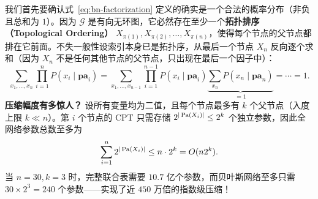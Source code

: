 我们首先要确认式~\eqref{eq:bn-factorization} 定义的确实是一个合法的概率分布（非负且总和为 $1$）。因为 $\mathcal{G}$ 是有向无环图，它必然存在至少一个\textbf{拓扑排序（Topological Ordering）} $X_{\pi(1)}, X_{\pi(2)}, \dots, X_{\pi(n)}$，使得每个节点的父节点都排在它前面。不失一般性设索引本身已是拓扑序，从最后一个节点 $X_n$ 反向逐个求和（因为 $X_n$ 不是任何其他节点的父节点，只出现在最后一个因子中）：
\[
  \sum_{x_1,\dots,x_n} \prod_{i=1}^{n} P(x_i \mid \mathbf{pa}_i)
  = \sum_{x_1,\dots,x_{n-1}} \prod_{i=1}^{n-1} P(x_i \mid \mathbf{pa}_i)
    \underbrace{\sum_{x_n} P(x_n \mid \mathbf{pa}_n)}_{=1}
  = \cdots = 1.
\]
\textbf{压缩幅度有多惊人？} 设所有变量均为二值，且每个节点最多有 $k$ 个父节点（入度上限 $k \ll n$）。第 $i$ 个节点的 CPT 只需存储 $2^{|\operatorname{Pa}(X_i)|} \le 2^k$ 个独立参数，因此全网络参数总数至多为
\[
  \sum_{i=1}^{n} 2^{|\operatorname{Pa}(X_i)|} \le n \cdot 2^k = O(n 2^k).
\]
当 $n = 30, k = 3$ 时，完整联合表需要 $10.7$ 亿个参数，而贝叶斯网络至多只需 $30 \times 2^3 = 240$ 个参数——实现了近 $450$ 万倍的指数级压缩！

